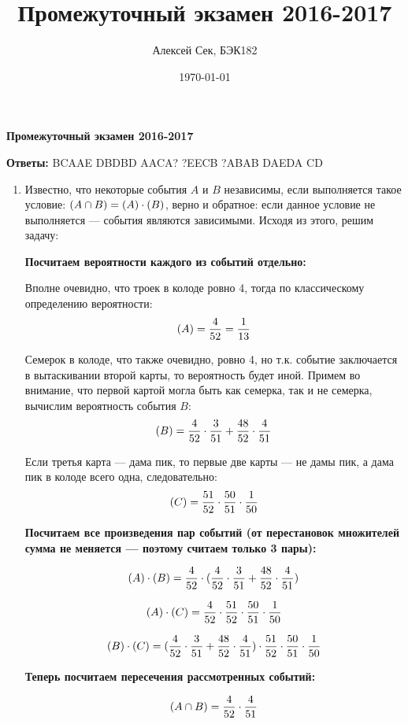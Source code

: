 \documentclass[a4paper]{article} %
\title{Промежуточный экзамен 2016-2017}
\author{Алексей Сек, БЭК182}
\date{\today}
\let\P\relax
\DeclareMathOperator{\P}{\mathbb{P}}
\begin{document}
\maketitle

\textbf{Промежуточный экзамен 2016-2017}

\textbf{Ответы:}
BCAAE DBDBD AACA? ?EECB ?ABAB DAEDA CD

\begin{enumerate}

    \item
    Известно, что некоторые события $A$ и $B$ независимы, если выполняется такое условие:
    $ \P(A \cap B) = \P(A) \cdot \P(B) $, верно и обратное: если данное условие не выполняется — события являются зависимыми. Исходя из этого, решим задачу:
    
    \textbf{Посчитаем вероятности каждого из событий отдельно:}
    
    Вполне очевидно, что троек в колоде ровно 4, тогда по классическому определению вероятности:
    \[ 
    \P(A) = \frac{4}{52} = \frac{1}{13} 
    \]
    
    Семерок в колоде, что также очевидно, ровно 4, но т.к. событие заключается в вытаскивании второй карты, то вероятность будет иной.
    Примем во внимание, что первой картой могла быть как семерка, так и не семерка, вычислим вероятность события $B$: 
    \[
    \P(B) = \frac{4}{52}\cdot\frac{3}{51} + \frac{48}{52}\cdot\frac{4}{51} 
    \]
    
    Если третья карта — дама пик, то первые две карты — не дамы пик, а дама пик в колоде всего одна, следовательно:
    \[ 
    \P(C) = \frac{51}{52}\cdot\frac{50}{51}\cdot\frac{1}{50} 
    \]
    
    \textbf{Посчитаем все произведения пар событий (от перестановок множителей сумма не меняется — поэтому считаем только 3 пары):}
    
    \[
    \P(A) \cdot \P(B) = \frac{4}{52}\cdot(\frac{4}{52}\cdot\frac{3}{51} + \frac{48}{52}\cdot\frac{4}{51}) 
    \]
    
    \[
     \P(A) \cdot \P(C) = \frac{4}{52}\cdot\frac{51}{52}\cdot\frac{50}{51}\cdot\frac{1}{50} 
    \]
    
    \[
     \P(B) \cdot \P(C) = (\frac{4}{52}\cdot\frac{3}{51} + \frac{48}{52}\cdot\frac{4}{51})\cdot\frac{51}{52}\cdot\frac{50}{51}\cdot\frac{1}{50}
    \]
    
    \textbf{Теперь посчитаем пересечения рассмотренных событий:}
    
    \[
    \P(A \cap B) = \frac{4}{52}\cdot\frac{4}{51}
    \]
    

\end{enumerate}
\end{document}
